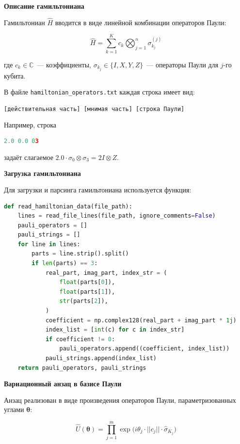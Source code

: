 \documentclass[a4paper]{report}
\begin{document}
\noindent
\textbf{Описание гамильтониана}

Гамильтониан $\hat{H}$ вводится в виде линейной комбинации операторов Паули:

\begin{equation}
    \hat{H} = \sum_{k=1}^K c_k \bigotimes_{j=1}^n \sigma_{k_j}^{(j)}
\end{equation}

где $c_k \in \mathbb{C}$~--- коэффициенты, $\sigma_{k_j} \in \{I, X, Y, Z\}$~--- операторы Паули для $j$-го кубита.

В файле \texttt{hamiltonian\_operators.txt} каждая строка имеет вид:

\begin{center}
\texttt{[действительная часть] [мнимая часть] [строка Паули]}
\end{center}

Например, строка
\begin{lstlisting}[language=Python]
2.0 0.0 03
\end{lstlisting}
задаёт слагаемое $2.0 \cdot \sigma_0 \otimes \sigma_3 = 2I \otimes Z$.

\noindent
\textbf{Загрузка гамильтониана}

Для загрузки и парсинга гамильтониана используется функция:

\begin{lstlisting}[language=Python]
def read_hamiltonian_data(file_path):
    lines = read_file_lines(file_path, ignore_comments=False)
    pauli_operators = []
    pauli_strings = []
    for line in lines:
        parts = line.strip().split()
        if len(parts) == 3:
            real_part, imag_part, index_str = (
                float(parts[0]),
                float(parts[1]),
                str(parts[2]),
            )
            coefficient = np.complex128(real_part + imag_part * 1j)
            index_list = [int(c) for c in index_str]
            if coefficient != 0:
                pauli_operators.append((coefficient, index_list))
            pauli_strings.append(index_list)
    return pauli_operators, pauli_strings
\end{lstlisting}

\noindent
\textbf{Вариационный анзац в базисе Паули}

Анзац реализован в виде произведения операторов Паули, параметризованных углами $\bm\theta$:

\begin{equation}
    \hat{U}(\bm\theta) = \prod_{j=1}^m \exp\Big(i \theta_j \cdot |\!|c_j|\!| \cdot \hat{\sigma}_{K_j}\Big)
\end{equation}
\end{document}
